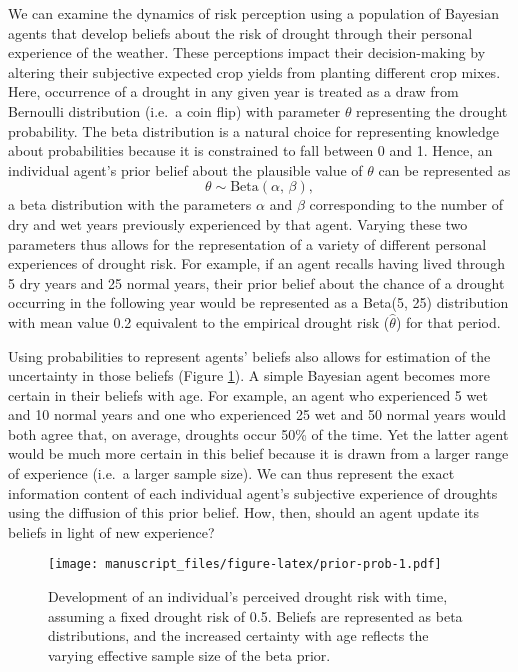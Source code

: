 \documentclass[smallextended]{svjour3}       %
\begin{document}
We can examine the dynamics of risk perception using a population of Bayesian agents that develop beliefs about the risk of drought through their personal experience of the weather. These perceptions impact their decision-making by altering their subjective expected crop yields from planting different crop mixes. Here, occurrence of a drought in any given year is treated as a draw from Bernoulli distribution (i.e.~a coin flip) with parameter \(\theta\) representing the drought probability. The beta distribution is a natural choice for representing knowledge about probabilities because it is constrained to fall between 0 and 1. Hence, an individual agent's prior belief about the plausible value of \(\theta\) can be represented as
\begin{equation}
  \theta \sim \textrm{Beta}(\alpha, \,\beta),
\end{equation}
a beta distribution with the parameters \(\alpha\) and \(\beta\) corresponding to the number of dry and wet years previously experienced by that agent. Varying these two parameters thus allows for the representation of a variety of different personal experiences of drought risk. For example, if an agent recalls having lived through 5 dry years and 25 normal years, their prior belief about the chance of a drought occurring in the following year would be represented as a Beta(5, 25) distribution with mean value 0.2 equivalent to the empirical drought risk (\(\hat\theta\)) for that period.

Using probabilities to represent agents' beliefs also allows for estimation of the uncertainty in those beliefs (Figure \ref{fig:prior-prob}). A simple Bayesian agent becomes more certain in their beliefs with age. For example, an agent who experienced 5 wet and 10 normal years and one who experienced 25 wet and 50 normal years would both agree that, on average, droughts occur 50\% of the time. Yet the latter agent would be much more certain in this belief because it is drawn from a larger range of experience (i.e.~a larger sample size). We can thus represent the exact information content of each individual agent's subjective experience of droughts using the diffusion of this prior belief. How, then, should an agent update its beliefs in light of new experience?

\begin{figure}
\centering
\texttt{[image: manuscript\_files/figure-latex/prior-prob-1.pdf]}
\caption{\label{fig:prior-prob}Development of an individual's perceived drought risk with time, assuming a fixed drought risk of 0.5. Beliefs are represented as beta distributions, and the increased certainty with age reflects the varying effective sample size of the beta prior.}
\end{figure}
\end{document}
